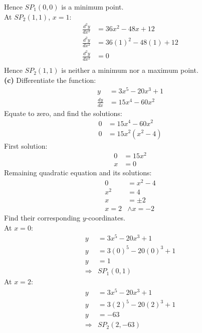 \documentclass[hidelinks, a4paper, 12pt]{article}
\newcommand{\bd}{\textbf}
\newcommand{\n}{\\[\baselineskip]}
\newcommand{\thus}{\Rightarrow}
\newcommand{\dydx}{\frac{dy}{dx}}
\newcommand{\dydxx}{\frac{d^2y}{dx^2}}
\begin{document}
                Hence $SP_1(0,0)$ is a minimum point.\n
                At $SP_2(1,1)$, $x=1$:
                \[\begin{split}
                    \dydxx &= 36x^2 - 48x + 12\\
                    \dydxx &= 36(1)^2 - 48(1) + 12\\
                    \dydxx &= 0\\
                \end{split}\]
                Hence $SP_2(1,1)$ is neither a minimum nor a maximum point.\n
                \bd{(c)} Differentiate the function:
                \[\begin{split}
                    y &= 3x^5 - 20x^3 +1\\
                    \dydx &= 15x^4 - 60x^2
                \end{split}\]
                Equate to zero, and find the solutions:
                \[\begin{split}
                    0 &= 15x^4 - 60x^2\\
                    0 &= 15x^2 (x^2-4)
                \end{split}\]
                First solution:
                \[\begin{split}
                    0 &= 15x^2\\
                    x &= 0
                \end{split}\]
                Remaining quadratic equation and its solutions:
                \[\begin{split}
                    0 &= x^2-4\\
                    x^2 &= 4\\
                    x &= \pm 2\\
                    x = 2 &\land x = -2
                \end{split}\]
                Find their corresponding $y$-coordinates.\n
                At $x = 0$:
                \[\begin{split}
                    y &= 3x^5 - 20x^3 +1\\
                    y &= 3(0)^5 - 20(0)^3 +1\\
                    y &= 1\\
                    \thus &SP_1(0,1)
                \end{split}\]
                At $x = 2$:
                \[\begin{split}
                    y &= 3x^5 - 20x^3 +1\\
                    y &= 3(2)^5 - 20(2)^3 +1\\
                    y &= -63\\
                    \thus &SP_2(2,-63)
                \end{split}\]
\end{document}
